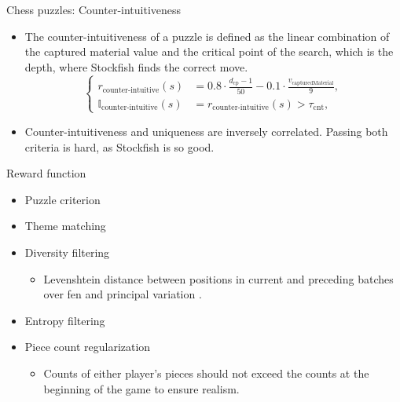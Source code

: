 \documentclass[normaltitle,first=orange,second=red,leqno]{aaltoslides}
\begin{document}
\begin{frame}{Chess puzzles: Counter-intuitiveness}
    \begin{itemize}
        \item<1-> The counter-intuitiveness of a puzzle is defined as the linear combination of the captured material value and the critical point of the search, which is the depth, where Stockfish finds the correct move.
        \begin{equation*}
            \left\{
                \begin{aligned}
                    r_{\text{counter-intuitive}}(s) &= 0.8 \cdot \frac{d_{\text{cp}} - 1}{50} - 0.1 \cdot \frac{v_{\text{capturedMaterial}}}{9}, \\
                    \mathbb{I}_{\text{counter-intuitive}}(s) &= r_{\text{counter-intuitive}}(s) > \tau_{\text{cnt}} ,
                \end{aligned}
            \right.
        \end{equation*}  
        \item<2-> Counter-intuitiveness and uniqueness are inversely correlated. Passing both criteria is hard, as Stockfish is so good.
    \end{itemize}
\end{frame}

\begin{frame}{Reward function}
    \begin{itemize}
        \item Puzzle criterion
        \item Theme matching
        \item Diversity filtering
        \begin{itemize}
            \item Levenshtein distance between positions in current and preceding batches over fen and principal variation \cite{li2007normalizedlevenshteindistance}.
        \end{itemize}
        \item Entropy filtering
        \item Piece count regularization
        \begin{itemize}
            \item Counts of either player's pieces should not exceed the counts at the beginning of the game to ensure realism.
        \end{itemize}
    \end{itemize}
\end{frame}
\end{document}

